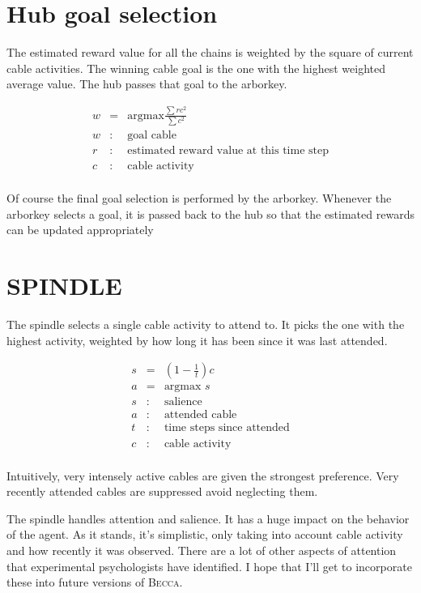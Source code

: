 \documentclass[oneside,twocolumn]{article}
\begin{document}
\section*{\color{copper} Hub goal selection}

The estimated reward value for all the chains is weighted by the square of current cable activities. The winning cable goal is the one with the highest weighted average value. The hub passes that goal to the arborkey. 

\begin{eqnarray*}
w &= & \mbox{argmax} \frac {\sum rc^2}{\sum c^2}\\ 
w &:& \mbox{goal cable} \\
r &:& \mbox{estimated reward value at this time step} \\
c &:& \mbox{cable activity} \\
\end{eqnarray*}

Of course the final goal selection is performed by the arborkey. Whenever the arborkey selects a goal, it is passed back to the hub so that the estimated rewards can be updated appropriately 

\section*{\color{copper} SPINDLE}

The spindle selects a single cable activity to attend to. It picks the one with the highest activity, weighted by how long it has been since it was last attended.

\begin{eqnarray*}
s &= & \left( 1 - \frac {1}{t} \right) c \\ 
a &= & \mbox{argmax } s \\ 
s &:& \mbox{salience} \\
a &:& \mbox{attended cable} \\
t &:& \mbox{time steps since attended} \\
c &:& \mbox{cable activity} \\
\end{eqnarray*}

Intuitively, very intensely active cables are given the strongest preference. Very recently attended cables are suppressed avoid neglecting them.

The spindle handles attention and salience. It has a huge impact on the behavior of the agent. As it stands, it's simplistic, only taking into account cable activity and how recently it was observed. There are a lot of other aspects of attention that experimental psychologists have identified. I hope that I'll get to incorporate these into future versions of \textsc{Becca}.
\end{document}
